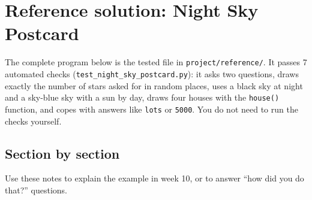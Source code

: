 \documentclass[level=1,teacher]{kidscode}
\begin{document}
\section{Reference solution: Night Sky Postcard}
The complete program below is the tested file in \texttt{project/\allowbreak{}reference/\allowbreak{}}. It passes 7 automated
checks (\texttt{test\_night\_sky\_postcard.py}): it asks two questions, draws exactly the number of
stars asked for in random places, uses a black sky at night and a sky-blue sky with a sun by day,
draws four houses with the \texttt{house()} function, and copes with answers like \texttt{lots} or
\texttt{5000}. You do not need to run the checks yourself.


\subsection{Section by section}
Use these notes to explain the example in week 10, or to answer \enquote{how did you do that?} questions.
\end{document}
